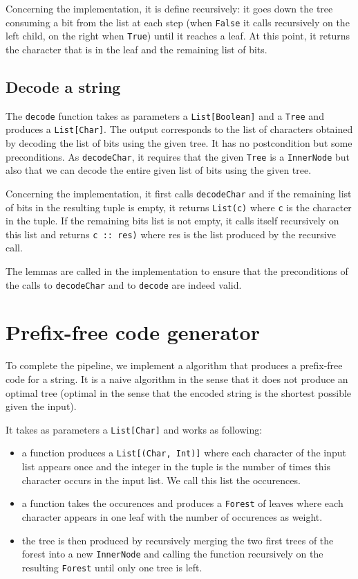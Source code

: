 \documentclass[a4paper,UKenglish,cleveref, autoref, thm-restate]{lipics-v2021}
\begin{document}
Concerning the implementation, it is define recursively: it goes down the tree consuming a bit from the list at each step (when \lstinline{False} it calls recursively on the left child, on the right when \lstinline{True}) until it reaches a leaf. At this point,
it returns the character that is in the leaf and the remaining list of bits.

\subsection{Decode a string}
The \lstinline{decode} function takes as parameters a \lstinline{List[Boolean]} and a \lstinline{Tree} and produces a \lstinline{List[Char]}. The output corresponds to the list of characters obtained by decoding the list of bits using the given tree.
It has no postcondition but some preconditions. As \lstinline{decodeChar}, it requires that the given \lstinline{Tree} is a \lstinline{InnerNode} but also that we can decode the entire given list of bits using the given tree.

Concerning the implementation, it first calls \lstinline{decodeChar} and if the remaining list of bits in the resulting tuple is empty, it returns \lstinline{List(c)} where \lstinline{c} is the character in the tuple. If the remaining bits list is not empty,
it calls itself recursively on this list and returns \lstinline{c :: res)} where res is the list produced by the recursive call.

The lemmas are called in the implementation to ensure that the preconditions of the calls to \lstinline{decodeChar} and to \lstinline{decode} are indeed valid.


\section{Prefix-free code generator} %
To complete the pipeline, we implement a algorithm that produces a prefix-free code for a string. It is a naive algorithm in the sense that it does not produce an optimal tree 
(optimal in the sense that the encoded string is the shortest possible given the input).

It takes as parameters a \lstinline{List[Char]} and works as following:
\begin{itemize}
    \item a function produces a \lstinline{List[(Char, Int)]} where each character of the input list appears once and the integer in the tuple is the number of times this character occurs in the input list. We call this list the occurences.
    \item a function takes the occurences and produces a \lstinline{Forest} of leaves where each character appears in one leaf with the number of occurences as weight.
    \item the tree is then produced by recursively merging the two first trees of the forest into a new \lstinline{InnerNode} and calling the function recursively on the resulting \lstinline{Forest} until only one tree is left.
\end{itemize}
\end{document}
